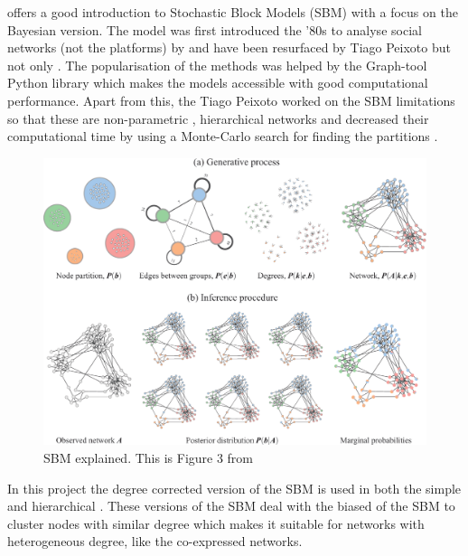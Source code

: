 \citet{Peixoto2019-fg} offers a good introduction to Stochastic Block Models (SBM) with a focus on the Bayesian version. The model was first introduced the '80s to analyse social networks (not the platforms) by \citet{Holland1983-eu} and have been resurfaced by Tiago Peixoto \cite{Peixoto2014-ls, Peixoto2017-gc, Peixoto2018-ot} but not only \cite{Karrer2011-si}. The popularisation of the methods was helped by the Graph-tool Python library \citet{Peixoto2014-ls} which makes the models accessible with good computational performance. Apart from this, the Tiago Peixoto worked on the SBM limitations so that these are non-parametric \citet{Peixoto2017-gc, Peixoto2018-ot}, hierarchical networks \citet{Peixoto2014-yb} and decreased their computational time by using a Monte-Carlo search for finding the partitions \cite{Peixoto2014-ss}.

\begin{figure}[!htb]    
    \centering
    \includegraphics[width=1.0\textwidth,height=1.0\textheight,keepaspectratio]{Sections/Network_I/Resources/dc-sbm_explained.png}
    \caption{SBM explained. This is Figure 3 from \citet{Peixoto2021-jx}}
    \label{fig:N_I:dc-sbm_explained}
\end{figure}


In this project the degree corrected version of the SBM is used in both the simple and hierarchical \citet{Karrer2011-si, Peixoto2014-yb}. These versions of the SBM deal with the biased of the SBM to cluster nodes with similar degree which makes it suitable for networks with heterogeneous degree, like the co-expressed networks.


